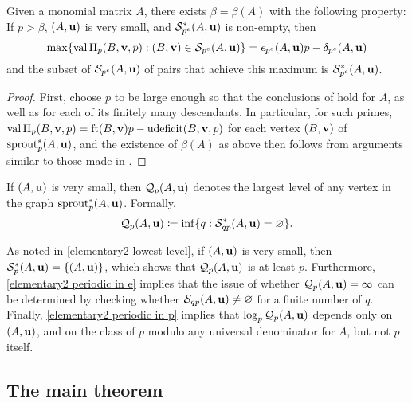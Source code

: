 \documentclass[11pt]{amsart}
\newcommand{\udeficit}{\operatorname{udeficit}}
\renewcommand{\S}{\mathcal{S}}
\begin{document}
\begin{proposition}
   \label{p large graph: P}
   Given a monomial matrix $A$, there exists $\beta = \beta(A)$ with the following property\textup:
   If $p > \beta$, $(A,\mathbf{u})$ is very small, and $\S_{p^e}^{\ast}(A,\vv{u})$ is non-empty, then
   \[
      \max \{ \val \IP_p(B,\vv{v},p) : (B,\vv{v}) \in \S_{p^e}(A,\vv{u}) \} = \epsilon_{p^e}(A,\vv{u}) p-\delta_{p^e}(A,\vv{u})
   \]
   and the subset of $\S_{p^e}(A,\vv{u})$ of pairs that achieve this maximum is $\S^{\ast}_{p^e}(A,\vv{u})$.
\end{proposition}

\begin{proof}
   First, choose $p$ to be large enough so that the conclusions of  hold for $A$, as well as for each of its finitely many descendants.
   In particular, for such primes, $\val \IP_p(B,\vv{v},p) = \ft{B}{\vv{v}}p-\udeficit(B,\vv{v},p)$  for each vertex $(B,\mathbf{v})$ of $\operatorname{sprout}_p^{\ast}(A,\mathbf{u})$, and the existence of $\beta(A)$ as above then follows from arguments similar to those made in .
\end{proof}

\begin{definition}
   If $(A,\mathbf{u})$ is very small, then $\mathcal{Q}_p(A,\mathbf{u})$ denotes the largest level of any vertex in the graph $\operatorname{sprout}_p^{\ast}(A,\mathbf{u})$.
   Formally,
   \[
      \mathcal{Q}_p(A,\vv{u}) \coloneqq \inf \{ q :  \S^{\ast}_{qp}(A,\vv{u}) = \emptyset \}.
   \]
\end{definition}

\begin{remark}
   As noted in \eqref{elementary2 lowest level}, if $(A,\mathbf{u})$ is very small, then $\S^{\ast}_p(A,\vv{u}) = \{ (A,\vv{u} )\}$, which shows that $\mathcal{Q}_p(A,\mathbf{u})$ is at least $p$.
   Furthermore, \eqref{elementary2 periodic in e}  implies that the issue of whether $\mathcal{Q}_p(A,\mathbf{u}) = \infty$ can be determined by checking whether $\S_{qp}(A,\vv{u}) \neq \emptyset$ for a finite number of $q$.
   Finally, \eqref{elementary2 periodic in p} implies that $\log_p \mathcal{Q}_p(A,\mathbf{u})$ depends only on $(A,\mathbf{u})$, and on the class of $p$ modulo any universal denominator for $A$, but not $p$ itself. 
\end{remark}

\subsection{The main theorem}
\end{document}
